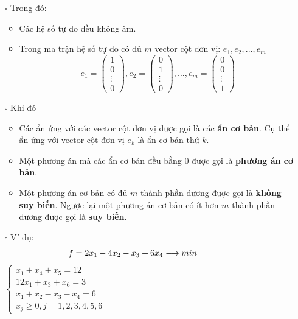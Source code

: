 \documentclass{article}
\begin{document}
\begin{itemize}
    \item [$\square$] Trong đó:
    \begin{itemize}[label=\textbullet]
        \item Các hệ số tự do đều không âm.
        \item Trong ma trận hệ số tự do có đủ $m$ vector cột đơn vị: $e_1, e_2,...,e_m$
        \begin{equation*}
            e_1 = 
\left(\begin{array}{l}
1 \\
0 \\
\vdots \\
0
\end{array}\right),
e_2 = 
\left(\begin{array}{l}
0 \\
1 \\
\vdots \\
0
\end{array}\right),...,
e_m = 
\left(\begin{array}{l}
0 \\
0 \\
\vdots \\
1
\end{array}\right)
        \end{equation*}
    \end{itemize}
    \item [$\square$] Khi đó
        \begin{itemize} [label=\textbullet]
            \item Các ẩn ứng với các vector cột đơn vị được gọi là các \textbf{ẩn cơ bản}. Cụ thể ẩn ứng với vector cột đơn vị $e_k$ là ẩn cơ bản thứ $k$.
            \item Một phương án mà các ẩn cơ bản đều bằng 0 được gọi là \textbf{phương án cơ bản}.
            \item Một phương án cơ bản có đủ $m$ thành phần dương được gọi là \textbf{không suy biến}. Ngược lại một phương án cơ bản có ít hơn $m$ thành phần dương được gọi là \textbf{suy biến}.
        \end{itemize}
    \item [$\square$] Ví dụ:
    \begin{equation*}
        f = 2x_1 - 4x_2 - x_3 + 6x_4 \longrightarrow min \hspace{1.5cm}
    \end{equation*}
    \hspace{3.7cm}
    $\begin{cases}
        x_1 + x_4 +x_5 = 12 \\
        12x_1 + x_3 + x_6= 3 \\
        x_1 + x_2 - x_3 -  x_4 = 6\\
        x_j \geq 0, j =1,2,3,4,5,6
    \end{cases}$
\end{itemize}
\end{document}
